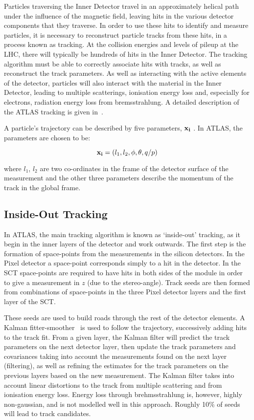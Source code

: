 Particles traversing the Inner Detector travel in an approximately helical path
under the influence of the magnetic field, leaving hits in the various detector
components that they traverse. In order to use these hits to identify and
measure particles, it is necessary to reconstruct particle tracks from these
hits, in a process known as tracking. At the collision energies and levels of
pileup at the LHC, there will typically be hundreds of hits in the Inner
Detector. The tracking algorithm must be able to correctly associate hits with
tracks, as well as reconstruct the track parameters. As well as interacting with
the active elements of the detector, particles will also interact with the
material in the Inner Detector, leading to multiple scatterings, ionisation
energy loss and, especially for electrons, radiation energy loss from
bremsstrahlung. A detailed description of the ATLAS tracking is given
in~\cite{1742-6596-119-3-032014}.

A particle's trajectory can be described by five parameters, $\bf{x_{i}}$ . In
ATLAS, the parameters are chosen to be:

\begin{equation} {\bf x_{i}} = (l_{1}, l_{2}, \phi, \theta, q/p) \end{equation}

where $l_{1}$, $l_{2}$ are two co-ordinates in the frame of the detector surface
of the measurement and the other three parameters describe the momentum of the
track in the global frame.

\subsection{Inside-Out Tracking} \label{sec:tracking-std}

In ATLAS, the main tracking algorithm is known as `inside-out' tracking, as it
begin in the inner layers of the detector and work outwards. The first step is
the formation of space-points from the measurements in the silicon detectors. In
the Pixel detector a space-point corresponds simply to a hit in the detector. In
the SCT space-points are required to have hits in both sides of the module in
order to give a measurement in $z$ (due to the stereo-angle). Track seeds are
then formed from combinations of space-points in the three Pixel detector layers
and the first layer of the SCT. 

These seeds are used to build roads through the rest of the detector elements. A
Kalman fitter-smoother~\cite{Fruhwirth:1987fm} is used to follow the trajectory,
successively adding hits to the track fit. From a given layer, the Kalman filter
will predict the track parameters on the next detector layer, then update the
track parameters and covariances taking into account the measurements found on
the next layer (filtering), as well as refining the estimates for the track
parameters on the previous layers based on the new measurement. The Kalman
filter takes into account linear distortions to the track from multiple
scattering and from ionisation energy loss. Energy loss through brehmsstrahlung
is, however, highly non-gaussian, and is not modelled well in this approach.
Roughly 10\% of seeds will lead to track candidates.

